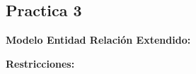 \documentclass{report}
\begin{document}
	
	
	
	\begin{center}
		\section*{\LARGE{Practica 3}}
	\end{center}
    \begin{center}
        \LARGE{\textbf{Modelo Entidad Relación Extendido:}}\\
    \end{center}
    \normalsize
    

    \begin{center}
        \LARGE{\textbf{Restricciones:}}\\
    \end{center}
    \normalsize

    
    \newpage
    
\printbibliography
  
\end{document}
